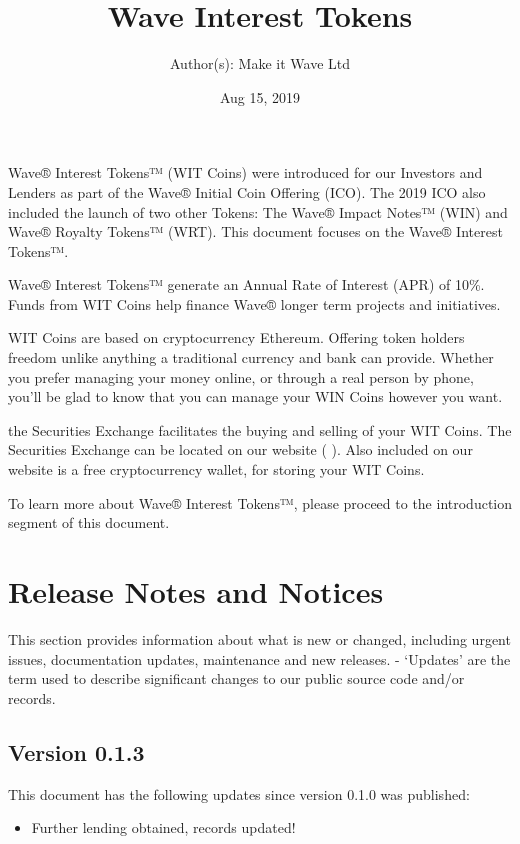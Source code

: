 \documentclass[letterpaper,10pt,openany,oneside,english]{sphinxmanual}
\title{Wave Interest Tokens}
\date{Aug 15, 2019}
\author{Author(s): Make it Wave Ltd}
\begin{document}
\maketitle
\sphinxtableofcontents
{}\label{\detokenize{index::doc}}


Wave® Interest Tokens™ (WIT Coins) were introduced for our Investors and Lenders as part of the Wave® Initial Coin Offering (ICO).
The 2019 ICO also included the launch of two other Tokens: The Wave® Impact Notes™ (WIN) and Wave® Royalty Tokens™ (WRT).
This document focuses on the Wave® Interest Tokens™.

Wave® Interest Tokens™ generate an Annual Rate of Interest (APR) of 10\%.
Funds from WIT Coins help finance Wave® longer term projects and initiatives.

WIT Coins are based on cryptocurrency Ethereum. Offering token holders freedom unlike anything a traditional currency and bank can provide.
Whether you prefer managing your money online, or through a real person by phone, you’ll be glad to know that you can manage your WIN Coins however you want.

the Securities Exchange facilitates the buying and selling of your WIT Coins.
The Securities Exchange can be located on our website (  ).
Also included on our website is a free cryptocurrency wallet, for storing your WIT Coins.

To learn more about Wave® Interest Tokens™, please proceed to the introduction segment of this document.


\chapter{Release Notes and Notices}
\label{\detokenize{releasenotes:release-notes-and-notices}}\label{\detokenize{releasenotes::doc}}
This section provides information about what is new or changed, including urgent issues, documentation updates, maintenance and new releases.
- ‘Updates’ are the term used to describe significant changes to our public source code and/or records.


\section{Version 0.1.3}
\label{\detokenize{releasenotes:version-0-1-3}}
This document has the following updates since version 0.1.0 was published:
\begin{itemize}
\item {} 
Further lending obtained, records updated!

\end{itemize}
\end{document}
